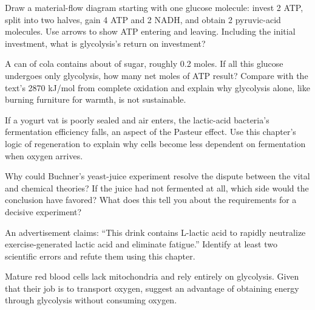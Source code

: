 \begin{sikaoti}
\item Draw a material-flow diagram starting with one glucose molecule: invest 2 ATP, split into two halves, gain 4 ATP and 2 NADH, and obtain 2 pyruvic-acid molecules. Use arrows to show ATP entering and leaving. Including the initial investment, what is glycolysis's return on investment?
\item A can of cola contains about  of sugar, roughly 0.2 moles. If all this glucose undergoes only glycolysis, how many net moles of ATP result? Compare with the text's 2870 kJ/mol from complete oxidation and explain why glycolysis alone, like burning furniture for warmth, is not sustainable.
\item If a yogurt vat is poorly sealed and air enters, the lactic-acid bacteria's fermentation efficiency falls, an aspect of the Pasteur effect. Use this chapter's logic of  regeneration to explain why cells become less dependent on fermentation when oxygen arrives.
\item Why could Buchner's yeast-juice experiment resolve the dispute between the vital and chemical theories? If the juice had not fermented at all, which side would the conclusion have favored? What does this tell you about the requirements for a decisive experiment?
\item An advertisement claims: ``This drink contains L-lactic acid to rapidly neutralize exercise-generated lactic acid and eliminate fatigue.'' Identify at least two scientific errors and refute them using this chapter.
\item Mature red blood cells lack mitochondria and rely entirely on glycolysis. Given that their job is to transport oxygen, suggest an advantage of obtaining energy through glycolysis without consuming oxygen.
\end{sikaoti}
